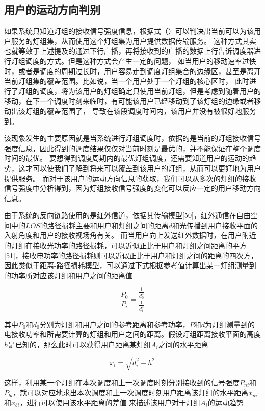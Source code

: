 \subsection{用户的运动方向判别}
如果系统只知道灯组的接收信号强度信息，根据式（）可以判决出当前可以为该用户服务的灯组集，从而使用这个灯组集为用户提供数据传输服务。
这种方式其实也就等效于上述提及的通过下行广播，再将接收到的广播的数据上行告诉调度器进行灯组调度的方式。但是这种方式会产生一定的问题，
如当用户的移动速率过快时，或者是调度的周期过长时，用户容易走到调度灯组集合的边缘区，甚至是离开当前灯组集的覆盖范围。比如说，当一个用户处于一个灯组的核心区时，
此时进行了灯组的调度，将为该用户的灯组确定只使用当前灯组，但是考虑到随着用户的移动，在下一个调度时刻来临时，有可能该用户已经移动到了该灯组的边缘或者移动出该灯组的覆盖范围了，
导致在该段调度时间内，该用户并没有被很好地服务到。

该现象发生的主要原因就是当系统进行灯组调度时，依据的是当前的灯组接收信号强度信息，因此得到的调度结果仅仅对当前时刻是最优的，并不能保证在整个调度时间的最优。
要想得到调度周期内的最优灯组调度，还需要知道用户的运动的趋势，这才可以使我们了解到将来可以覆盖到该用户的灯组，从而可以更好地为用户提供服务。
而对于该用户的运动方向信息的获取，我们可以从多次的灯组的接收信号强度中分析得到，因为灯组接收信号强度的变化可以反应一定的用户移动方向信息。

由于系统的反向链路使用的是红外信道，依据其传输模型[50]，红外通信在自由空间中的$LOS$的路径损耗主要和用户和灯组之间的距离$d$和光传播到用户接收平面的入射角度和用户的接收视场角有关。
而当用户向上发送红外数据时，在用户附近的灯组在接收光功率的路径损耗，可以近似正比于用户和灯组之间距离的平方[51]，接收电功率的路径损耗则可以近似正比于用户和灯组之间的距离的四次方，
因此类似于距离-路径损耗模型，可以通过下式根据参考值计算出某一灯组测量到的功率所对应该灯组和用户之间的距离值

\begin{equation}
    \frac{{{P_0}}}{{{P_i}}} = \frac{{\frac{1}{{d_0^4}}}}{{\frac{1}{{d_i^4}}}}
\end{equation}

其中$P_{0}$和$d_{0}$分别为灯组和用户之间的参考距离和参考功率，$P$和$d$为灯组测量到的电接收功率和所需要计算的灯组和用户之间的距离。假设灯组距离接收平面的高度$h$是已知的，那么此时可以获得用户距离某灯组$A_{i}$之间的水平距离

\begin{equation}
    {x_i} = \sqrt {d_i^2 - {h^2}}
\end{equation}

这样，利用某一个灯组在本次调度和上一次调度时刻分别接收到的信号强度$P_{ni}$和$P_{bi}$，就可以对应地求出本次调度和上一次调度时刻用户距离该灯组的水平距离$x_{ni}$和$x_{bi}$，进行可以使用该水平距离的差值 来描述该用户对于灯组$A_{i}$的运动趋势

